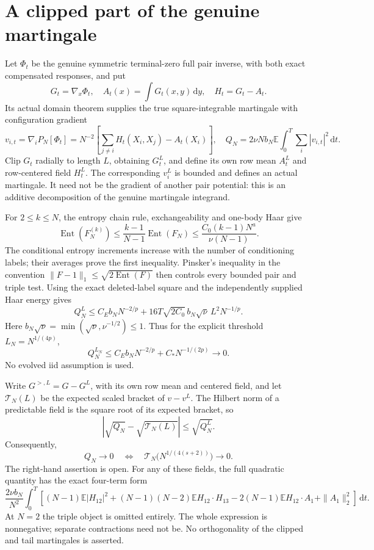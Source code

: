 \documentclass[10pt]{article}
\newcommand{\E}{\mathbb E}
\newcommand{\dd}{\,\mathrm d}
\begin{document}
\newpage
\section*{A clipped part of the genuine martingale}
Let $\Phi_t$ be the genuine symmetric terminal-zero full pair inverse, with
both exact compensated responses, and put
\[
 G_t=\nabla_x\Phi_t,\quad A_t(x)=\int G_t(x,y)\dd y,\quad H_t=G_t-A_t.
\]
Its actual domain theorem supplies the true square-integrable martingale
with configuration gradient
\[
 v_{i,t}=\nabla_iP_N[\Phi_t]
  =N^{-2}\left[\sum_{j\ne i}H_t(X_i,X_j)-A_t(X_i)\right],
 \quad Q_N=2\nu Nb_N\E\int_0^T\sum_i|v_{i,t}|^2\dd t.
\]
Clip $G_t$ radially to length $L$, obtaining $G_t^L$, and define its own row
mean $A_t^L$ and row-centered field $H_t^L$. The corresponding $v_i^L$
is bounded and defines an actual martingale. It need not be the gradient
of another pair potential: this is an additive decomposition of the genuine
martingale integrand.

For $2\le k\le N$, the entropy chain rule, exchangeability and one-body
Haar give
\[
 \operatorname{Ent}(F_N^{(k)})
 \le\frac{k-1}{N-1}\operatorname{Ent}(F_N)
 \le\frac{C_0(k-1)N^a}{\nu(N-1)}.
\]
The conditional entropy increments increase with the number of conditioning
labels; their averages prove the first inequality. Pinsker's inequality in
the convention $\|F-1\|_1\le\sqrt{2\operatorname{Ent}(F)}$ then controls
every bounded pair and triple test. Using the exact deleted-label square
and the independently supplied Haar energy gives
\[
 Q_N^L\le C_E b_NN^{-2/p}
       +16T\sqrt{2C_0}\,b_N\sqrt\nu\,L^2N^{-1/p}.
\]
Here $b_N\sqrt\nu=\min(\sqrt\nu,\nu^{-1/2})\le1$. Thus for the explicit
threshold $L_N=N^{1/(4p)}$,
\[
 Q_N^{L_N}\le C_E b_NN^{-2/p}+C_*N^{-1/(2p)}\longrightarrow0.
\]
No evolved iid assumption is used.

Write $G^{>,L}=G-G^L$, with its own row mean and centered field, and let
$\mathcal T_N(L)$ be the expected scaled bracket of $v-v^L$. The Hilbert
norm of a predictable field is the square root of its expected bracket, so
\[
 \left|\sqrt{Q_N}-\sqrt{\mathcal T_N(L)}\right|\le\sqrt{Q_N^L}.
\]
Consequently,
\[
 Q_N\longrightarrow0
 \quad\Longleftrightarrow\quad
 \mathcal T_N\bigl(N^{1/(4(s+2))}\bigr)\longrightarrow0.
 \tag{A}
\]
The right-hand assertion is open. For any of these fields, the full quadratic
quantity has the exact four-term form
\[
 \frac{2\nu b_N}{N^2}\int_0^T\!\left[
 (N-1)\E|H_{12}|^2+(N-1)(N-2)\E H_{12}\cdot H_{13}
 -2(N-1)\E H_{12}\cdot A_1+\|A_1\|_2^2\right]\dd t.
\]
At $N=2$ the triple object is omitted entirely. The whole expression is
nonnegative; separate contractions need not be. No orthogonality of the
clipped and tail martingales is asserted.
\end{document}
